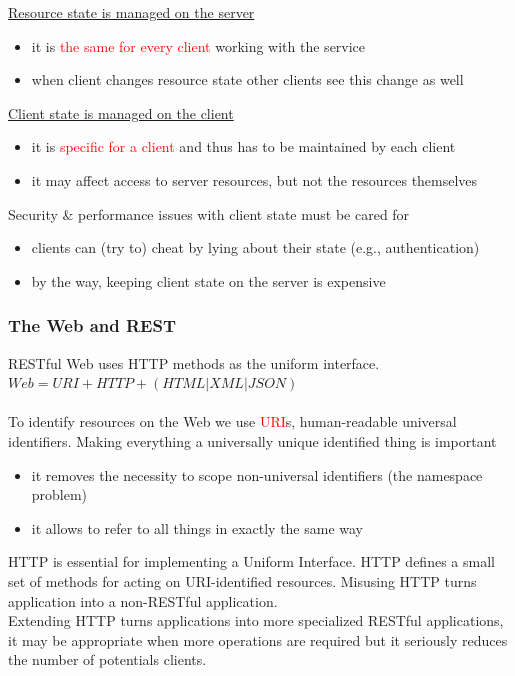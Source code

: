 \documentclass[10pt,a4paper]{article}
\newcommand{\nline}{\\~\\}
\begin{document}
\begin{itemize}
 	\uline{Resource state is managed on the server}
 	\begin{itemize}
 		\item it is \textcolor{red}{the same for every client} working with the service
 		\item when client changes resource state other clients see this change as well
 	\end{itemize}
 	\uline{Client state is managed on the client}
 	\begin{itemize}
 		\item it is \textcolor{red}{specific for a client} and thus has to be maintained by each client
 		\item it may affect access to server resources, but not the resources themselves
 	\end{itemize}
 	Security \& performance issues with client state must be cared for
 	\begin{itemize}
 		\item clients can (try to) cheat by lying about their state (e.g., authentication)
 		\item by the way, keeping client state on the server is expensive
  	\end{itemize}
 \end{itemize}
 \subsubsection{The Web and REST}
 RESTful Web uses HTTP methods as the uniform interface. \\
 $Web=URI+HTTP+(HTML|XML|JSON)$ \nline
 To identify resources on the Web we use \textcolor{red}{URI}s, human-readable universal identifiers. Making everything a universally unique identified thing is important
 \begin{itemize}
 	\item it removes the necessity to scope non-universal identifiers (the namespace problem)
 	\item it allows to refer to all things in exactly the same way
 \end{itemize}
 HTTP is essential for implementing a Uniform Interface. HTTP defines a small set of methods for acting on URI-identified resources. Misusing HTTP turns application into a non-RESTful application. \\
 Extending HTTP turns applications into more specialized RESTful applications, it may be appropriate when more operations are required but it seriously reduces the number of potentials clients.
  \nline
\end{document}
